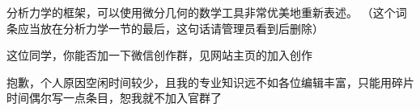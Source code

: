 分析力学的框架，可以使用微分几何的数学工具非常优美地重新表述。
（这个词条应当放在分析力学一节的最后，这句话请管理员看到后删除）

这位同学，你能否加一下微信创作群，见网站主页的加入创作

抱歉，个人原因空闲时间较少，且我的专业知识远不如各位编辑丰富，只能用碎片时间偶尔写一点条目，恕我就不加入官群了